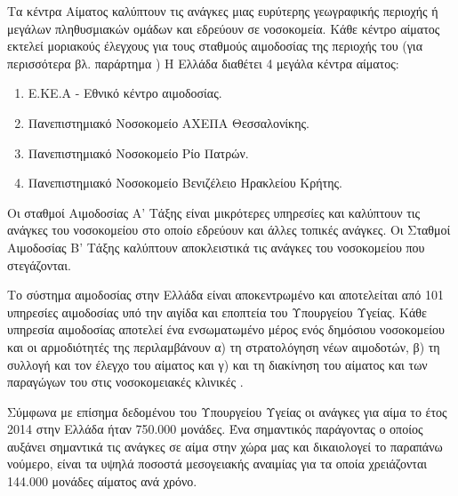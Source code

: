 		 Τα κέντρα Αίματος καλύπτουν τις ανάγκες μιας ευρύτερης γεωγραφικής περιοχής ή μεγάλων πληθυσμιακών ομάδων και εδρεύουν σε νοσοκομεία. Κάθε κέντρο αίματος εκτελεί μοριακούς έλεγχους για τους σταθμούς αιμοδοσίας της περιοχής του (για περισσότερα βλ. παράρτημα ) Η Ελλάδα διαθέτει 4 μεγάλα κέντρα αίματος: 
		\begin{enumerate}
			\item Ε.ΚΕ.Α - Εθνικό κέντρο αιμοδοσίας.
			\item Πανεπιστημιακό Νοσοκομείο ΑΧΕΠΑ Θεσσαλονίκης.
			\item Πανεπιστημιακό Νοσοκομείο Ρίο Πατρών.
			\item Πανεπιστημιακό Νοσοκομείο Βενιζέλειο Ηρακλείου Κρήτης.
		\end{enumerate}				 
		 
		 Οι σταθμοί Αιμοδοσίας Α' Τάξης είναι μικρότερες υπηρεσίες και καλύπτουν τις ανάγκες του νοσοκομείου στο οποίο εδρεύουν και άλλες τοπικές ανάγκες. Οι Σταθμοί Αιμοδοσίας Β' Τάξης καλύπτουν αποκλειστικά τις ανάγκες του νοσοκομείου που στεγάζονται.
		
		Το σύστημα αιμοδοσίας στην Ελλάδα είναι αποκεντρωμένο και αποτελείται από 101 υπηρεσίες αιμοδοσίας υπό την αιγίδα και εποπτεία του Υπουργείου Υγείας\cite{filloKivernisews}. Κάθε υπηρεσία αιμοδοσίας αποτελεί ένα ενσωματωμένο μέρος ενός δημόσιου νοσοκομείου και οι αρμοδιότητές της περιλαμβάνουν α) τη στρατολόγηση νέων αιμοδοτών, β) τη συλλογή και τον έλεγχο του αίματος και γ) και τη διακίνηση του αίματος και των παραγώγων του στις νοσοκομειακές κλινικές \cite{Marantidou2007}.
		
		Σύμφωνα με επίσημα δεδομένου του Υπουργείου Υγείας οι ανάγκες για αίμα το έτος 2014 στην Ελλάδα ήταν 750.000 μονάδες. Ένα σημαντικός παράγοντας ο οποίος αυξάνει σημαντικά τις ανάγκες σε αίμα στην χώρα μας και δικαιολογεί το παραπάνω νούμερο, είναι τα υψηλά ποσοστά μεσογειακής αναιμίας για τα οποία χρειάζονται 144.000 μονάδες αίματος ανά χρόνο. 
		

